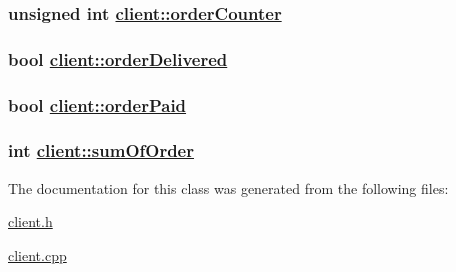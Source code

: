\hypertarget{classclient_25f95fa8cae78c29d5fe90cb9879944a}{
\subsubsection[orderCounter]{\setlength{\rightskip}{0pt plus 5cm}unsigned int \hyperlink{classclient_25f95fa8cae78c29d5fe90cb9879944a}{client::order\-Counter}}}
\label{classclient_25f95fa8cae78c29d5fe90cb9879944a}


\hypertarget{classclient_63c4891c26137238d3075aa6a395c235}{
\subsubsection[orderDelivered]{\setlength{\rightskip}{0pt plus 5cm}bool \hyperlink{classclient_63c4891c26137238d3075aa6a395c235}{client::order\-Delivered}}}
\label{classclient_63c4891c26137238d3075aa6a395c235}


\hypertarget{classclient_8498e9222401c9034d4e5a26970a3400}{
\subsubsection[orderPaid]{\setlength{\rightskip}{0pt plus 5cm}bool \hyperlink{classclient_8498e9222401c9034d4e5a26970a3400}{client::order\-Paid}}}
\label{classclient_8498e9222401c9034d4e5a26970a3400}


\hypertarget{classclient_89b86d03136dc2f044d7669137baf6b5}{
\subsubsection[sumOfOrder]{\setlength{\rightskip}{0pt plus 5cm}int \hyperlink{classclient_89b86d03136dc2f044d7669137baf6b5}{client::sum\-Of\-Order}}}
\label{classclient_89b86d03136dc2f044d7669137baf6b5}




The documentation for this class was generated from the following files:\begin{CompactItemize}
\item 
\hyperlink{client_8h}{client.h}\item 
\hyperlink{client_8cpp}{client.cpp}\end{CompactItemize}
